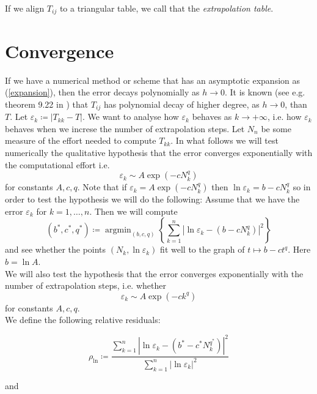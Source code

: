 If we align \(T_{ij}\) to a triangular table, we call that the {\it extrapolation table}.\\

\section{Convergence}

If we have a numerical method or scheme that has an asymptotic expansion as (\ref{expansion}), then the error decays polynomially as \(h\rightarrow 0\). It is known (see e.g. theorem 9.22 in \cite{dh}) that \(T_{ij}\) has  polynomial decay of higher degree, as \(h\rightarrow 0\), than \(T\). Let \(\varepsilon_k \coloneqq |T_{kk} - T|\). We want to analyse how \(\varepsilon_k\) behaves as \(k\rightarrow +\infty\), i.e. how \(\varepsilon_k\) behaves when we increse the number of extrapolation steps. Let \(N_n\) be some measure of the effort needed to compute \(T_{kk}\). In what follows we will test numerically the qualitative hypothesis that the error converges exponentially with the computational effort i.e.
\begin{equation}
\varepsilon_k \sim A \exp(-cN_k^q)
\end{equation}
for constants \(A, c, q\). Note that if \(\varepsilon_k = A\exp(-c N_k^q)\) then \(\ln\varepsilon_k = b - cN_k^q\) so in order to test the hypothesis we will do the following: Assume that we have the error \(\varepsilon_k\) for \(k=1,\ldots,n\). Then we will compute
\begin{equation}
(b^*,c^*,q^*) \coloneqq \operatorname{arg min}_{(b,c,q)} \left\{\sum_{k=1}^n|\ln \varepsilon_k - (b - cN_k^q)|^2\right\}
\end{equation}
and see whether the points \((N_k,\ln\varepsilon_k)\) fit well to the graph of \(t\mapsto b - ct^q\). Here \(b = \ln A\).\\

We will also test the hypothesis that the error converges exponentially with the number of extrapolation steps, i.e. whether
\begin{equation}
\varepsilon_k \sim A \exp(-ck^q)
\end{equation}
for constants \(A,c,q\).\\

We define the following relative residuals:

\[
\rho_{\ln} \coloneqq \frac{\sum_{k=1}^n|\ln\varepsilon_k  - (b^* - c^*N_k^{q^*})|^2}{\sum_{k=1}^n|\ln\varepsilon_k|^2}
\]

and 


